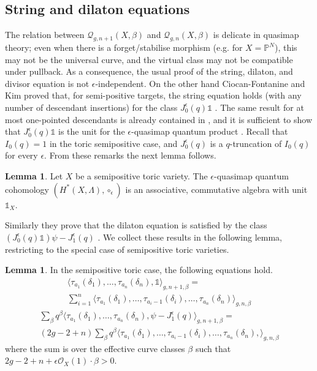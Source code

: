 \documentclass[11pt]{amsart}
\newcommand{\Q}[4]{\mathcal{Q}_{#1,#2}(#3,#4)}
\newcommand{\PP}{\mathbb P}
\newcommand{\OO}{\mathcal{O}}
\theoremstyle{definition}
\newtheorem{lemma}[thm]{Lemma}
\theoremstyle{definition}
\begin{document}
\subsection{String and dilaton equations}
 The relation between $\Q{g}{n+1}{X}{\beta}$ and $\Q{g}{n}{X}{\beta}$ is delicate in quasimap theory; even when there is a forget/stabilise morphism (e.g. for $X=\PP^N$), this may not be the universal curve, and the virtual class may not be compatible under pullback. As a consequence, the usual proof of the string, dilaton, and divisor equation is not $\epsilon$-independent. On the other hand Ciocan-Fontanine and Kim proved that, for semi-positive targets, the string equation holds (with any number of descendant insertions) for the class $J_0^\epsilon(q)\mathds{1}$ \cite[Proposition 3.4.1]{CF-K-higher-genus}. The same result for at most one-pointed descendants is already contained in \cite[Corollary 5.5.4]{CF-K-wallcrossing}, and it is sufficient to show that $J_0^\epsilon(q)\mathds{1}$ is the unit for the $\epsilon$-quasimap quantum product \cite[Remark 3.1.4]{CF-K-higher-genus}. Recall that $I_0(q)=1$ in the toric semipositive case, and $J_0^\epsilon(q)$ is a $q$-truncation of $I_0(q)$ for every $\epsilon$. From these remarks the next lemma follows.

 \begin{lemma}
 Let $X$ be a semipositive toric variety. The $\epsilon$-quasimap quantum cohomology $(H^*(X,\Lambda),\circ_\epsilon)$ is an associative, commutative algebra with unit $\mathds 1_X$.
 \end{lemma}
 
 Similarly they prove that the dilaton equation is satisfied by the class $(J_0^\epsilon(q)\mathds{1})\psi-J_1^\epsilon(q)$ \cite[Lemma 3.4.3]{CF-K-higher-genus}. We collect these results in the following lemma, restricting to the special case of semipositive toric varieties.
 \begin{lemma}
  In the semipositive toric case, the following equations hold.
  \begin{multline}\tag{string}
   \langle \tau_{a_1}(\delta_1),\ldots,\tau_{a_n}(\delta_n), \mathds{1}\rangle_{g,n+1,\beta}= \\
   \sum_{i=1}^n\langle \tau_{a_1}(\delta_1),\ldots,\tau_{a_i-1}(\delta_i),\ldots,\tau_{a_n}(\delta_n)\rangle_{g,n,\beta}
  \end{multline}
 \begin{multline}\tag{dilaton}
  \sum_{\beta}q^\beta\langle \tau_{a_1}(\delta_1),\ldots,\tau_{a_n}(\delta_n), \psi-J^\epsilon_1(q)\rangle_{g,n+1,\beta}= \\
  (2g-2+n)\sum_{\beta}q^\beta\langle \tau_{a_1}(\delta_1),\ldots,\tau_{a_i-1}(\delta_i),\ldots,\tau_{a_n}(\delta_n), \rangle_{g,n,\beta}
 \end{multline}
where the sum is over the effective curve classes $\beta$ such that $2g-2+n+\epsilon\OO_X(1)\cdot\beta>0$.
 \end{lemma}
\end{document}
